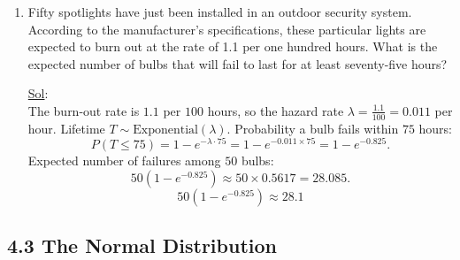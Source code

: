 \begin{enumerate}
	      \[
		      \boxed{X+Y \sim \text{Poisson}(\lambda+\mu)}
	      \]

	\item[28.] Fifty spotlights have just been installed in an outdoor security system. According to the manufacturer’s specifications, these particular lights are expected to burn out at the rate of 1.1 per one hundred hours. What is the expected number of bulbs that will fail to last for at least seventy-five hours?

	      \underline{Sol}: \\

	      The burn-out rate is \(1.1\) per \(100\) hours, so the hazard rate \(\lambda = \frac{1.1}{100} = 0.011\) per hour.
	      Lifetime \(T \sim \text{Exponential}(\lambda)\).
	      Probability a bulb fails within \(75\) hours:
	      \[
		      P(T \le 75) = 1 - e^{-\lambda \cdot 75} = 1 - e^{-0.011 \times 75} = 1 - e^{-0.825}.
	      \]
	      Expected number of failures among \(50\) bulbs:
	      \[
		      50 \left(1 - e^{-0.825}\right) \approx 50 \times 0.5617 = 28.085.
	      \]
	      \[
		      \boxed{50\left(1 - e^{-0.825}\right) \approx 28.1}
	      \]
\end{enumerate}

\subsection*{4.3 The Normal Distribution}

